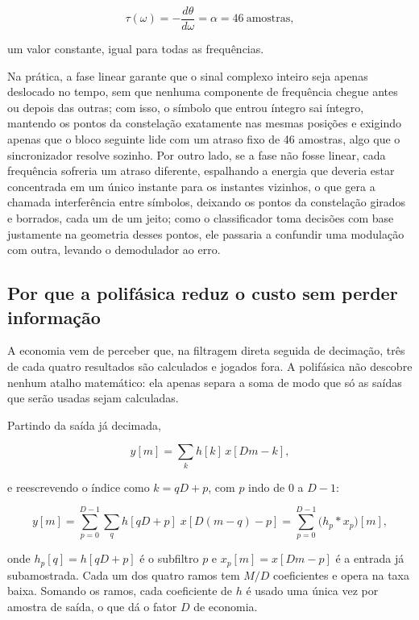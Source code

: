 \begin{equation}
\tau(\omega) = -\frac{d\theta}{d\omega} = \alpha = 46 \ \mathrm{amostras},
\end{equation}

um valor constante, igual para todas as frequências.

Na prática, a fase linear garante que o sinal complexo inteiro seja apenas deslocado no tempo, sem que nenhuma componente de frequência chegue antes ou depois das outras; com isso, o símbolo que entrou íntegro sai íntegro, mantendo os pontos da constelação exatamente nas mesmas posições e exigindo apenas que o bloco seguinte lide com um atraso fixo de 46 amostras, algo que o sincronizador resolve sozinho. Por outro lado, se a fase não fosse linear, cada frequência sofreria um atraso diferente, espalhando a energia que deveria estar concentrada em um único instante para os instantes vizinhos, o que gera a chamada interferência entre símbolos, deixando os pontos da constelação girados e borrados, cada um de um jeito; como o classificador toma decisões com base justamente na geometria desses pontos, ele passaria a confundir uma modulação com outra, levando o demodulador ao erro.

\subsection{Por que a polifásica reduz o custo sem perder informação}

A economia vem de perceber que, na filtragem direta seguida de decimação, três de cada quatro resultados são calculados e jogados fora. A polifásica não descobre nenhum atalho matemático: ela apenas separa a soma de modo que só as saídas que serão usadas sejam calculadas.

Partindo da saída já decimada,

\begin{equation}
y[m] = \sum_k h[k]\,x[Dm-k],
\end{equation}

e reescrevendo o índice como $k = qD + p$, com $p$ indo de $0$ a $D-1$:

\begin{equation}
y[m] = \sum_{p=0}^{D-1}\sum_q h[qD+p]\;x[D(m-q)-p]
     = \sum_{p=0}^{D-1}\big(h_p * x_p\big)[m],
\end{equation}

onde $h_p[q] = h[qD+p]$ é o subfiltro $p$ e $x_p[m] = x[Dm-p]$ é a entrada já subamostrada. Cada um dos quatro ramos tem $M/D$ coeficientes e opera na taxa baixa. Somando os ramos, cada coeficiente de $h$ é usado uma única vez por amostra de saída, o que dá o fator $D$ de economia.

